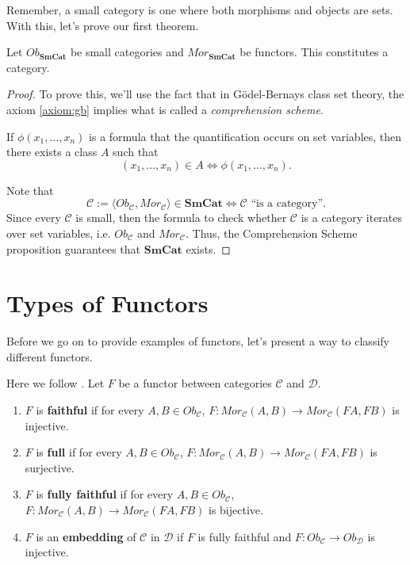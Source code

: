 Remember, a small category is one where both morphisms and objects are sets.
With this, let's prove our first theorem.
\begin{theorem}
	Let $Ob_{\textbf{SmCat}}$ be small categories and $Mor_{\textbf{SmCat}}$ be functors.
	This constitutes a category.
\end{theorem}
\begin{proof}
	To prove this, we'll use the fact that in Gödel-Bernays class set theory, the
	axiom \ref{axiom:gb} implies what is called a \textit{comprehension scheme}.
	\begin{proposition}
		If $\phi(x_1,...,x_n)$ is a formula that the quantification occurs on set variables, then
		there exists a class $A$ such that
		\begin{displaymath}
			(x_1,...,x_n) \in A \iff \phi(x_1,...,x_n).
		\end{displaymath}
	\end{proposition}
	Note that
	\begin{displaymath}
		\mathcal C := \langle Ob_\mathcal C, Mor_\mathcal C \rangle \in \textbf{SmCat} \iff
		\mathcal C \text{ ``is a category''}.
	\end{displaymath}
	Since every $\mathcal C$ is small, then the formula to check whether $\mathcal C$ is a category
	iterates over set variables, i.e. $Ob_\mathcal C$ and $Mor_\mathcal C$.
	Thus, the Comprehension Scheme proposition guarantees that $\textbf{SmCat}$ exists.
\end{proof}

\section{Types of Functors}

Before we go on to provide examples of functors, let's present
a way to classify different functors.

\begin{definition}
	Here we follow \citet{roman2017introduction}.
	Let $F$ be a functor between categories $\mathcal C$ and $\mathcal D$.
	\begin{enumerate}[1.]
		\item $F$ is \textbf{faithful} if for every $A,B \in Ob_\mathcal C$,
		      $F:Mor_\mathcal C(A,B)\to Mor_\mathcal C(FA,FB)$ is injective.
		\item $F$ is \textbf{full} if for every $A,B \in Ob_\mathcal C$,
		      $F:Mor_\mathcal C(A,B)\to Mor_\mathcal C(FA,FB)$ is surjective.
		\item $F$ is \textbf{fully faithful} if for every $A,B \in Ob_\mathcal C$,
		      $F:Mor_\mathcal C(A,B)\to Mor_\mathcal C(FA,FB)$ is bijective.
		\item $F$ is an \textbf{embedding} of $\mathcal C$ in $\mathcal D$ if $F$ is fully faithful
		      and $F:Ob_\mathcal C \to Ob_\mathcal D$ is injective.
	\end{enumerate}

\end{definition}

